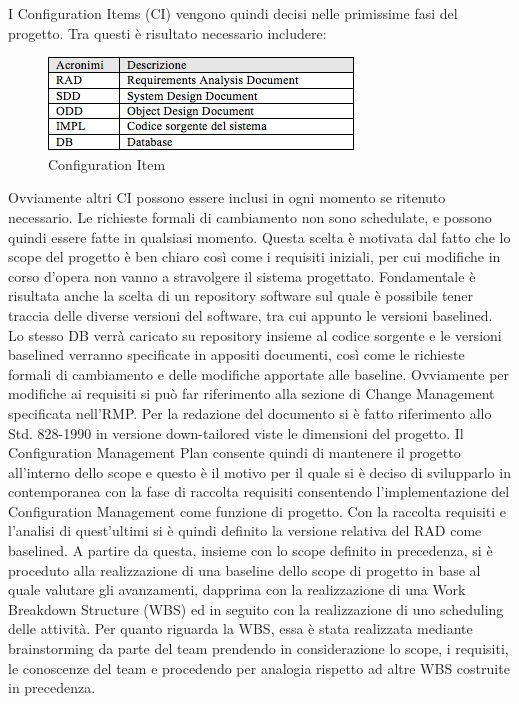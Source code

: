 I Configuration Items (CI) vengono quindi decisi nelle primissime fasi del progetto. Tra questi \`{e} risultato necessario includere: 
\begin{figure}[h]
\centering
\includegraphics[scale=.7]{img/5.png}
\caption{Configuration Item}
\label{fig:cd}
\end{figure}
Ovviamente altri CI possono essere inclusi in ogni momento se ritenuto necessario.
Le richieste formali di cambiamento non sono schedulate, e possono quindi essere fatte in qualsiasi momento. Questa scelta \`{e} motivata dal fatto che lo scope del progetto \`{e} ben chiaro cos\`{i} come i requisiti iniziali, per cui modifiche in corso d\rq opera non vanno a stravolgere il sistema progettato.
Fondamentale \`{e} risultata anche la scelta di un repository software sul quale \`{e} possibile tener traccia delle diverse versioni del software, tra cui appunto le versioni baselined. Lo stesso DB verr\`{a} caricato su repository insieme al codice sorgente e le versioni baselined verranno specificate in appositi documenti, cos\`{i} come le richieste formali di cambiamento e delle modifiche apportate alle baseline.
Ovviamente per modifiche ai requisiti si pu\`{o} far riferimento alla sezione di Change Management specificata nell\rq RMP.
Per la redazione del documento si \`{e} fatto riferimento allo Std. 828-1990 in versione down-tailored viste le dimensioni del progetto.
Il Configuration Management Plan consente quindi di mantenere il progetto all\rq interno dello scope e questo \`{e} il motivo per il quale si \`{e} deciso di svilupparlo in contemporanea con la fase di raccolta requisiti consentendo l\rq implementazione del Configuration Management come funzione di progetto.
Con la raccolta requisiti e l\rq analisi di quest\rq ultimi si \`{e} quindi definito la versione relativa del RAD come baselined.
A partire da questa, insieme con lo scope definito in precedenza, si \`{e} proceduto alla realizzazione di una baseline dello scope di progetto in base al quale valutare gli avanzamenti, dapprima con la realizzazione di una Work Breakdown Structure (WBS) ed in seguito con la realizzazione di uno scheduling delle attivit\`{a}.
Per quanto riguarda la WBS, essa \`{e} stata realizzata mediante brainstorming da parte del team prendendo in considerazione lo scope, i requisiti, le conoscenze del team e procedendo per analogia rispetto ad altre WBS costruite in precedenza.
